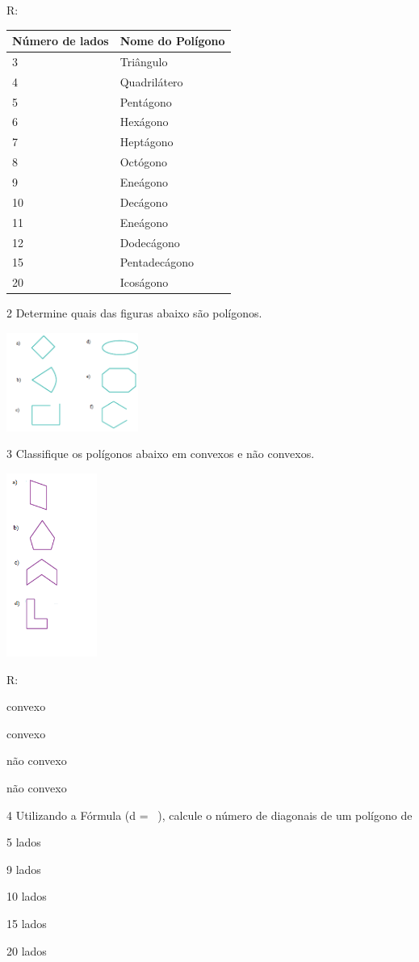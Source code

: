 {R: \begin{longtable}[]{@{}ll@{}}
\toprule
Número de lados & Nome do Polígono\tabularnewline
\midrule
\endhead
3 & Triângulo\tabularnewline
4 & Quadrilátero\tabularnewline
5 & Pentágono\tabularnewline
6 & Hexágono\tabularnewline
7 & Heptágono\tabularnewline
8 & Octógono\tabularnewline
9 & Eneágono\tabularnewline
10 & Decágono\tabularnewline
11 & Eneágono\tabularnewline
12 & Dodecágono\tabularnewline
15 & Pentadecágono\tabularnewline
20 & Icoságono\tabularnewline
\bottomrule
\end{longtable}

\num{2} Determine quais das figuras abaixo são polígonos.

\includegraphics[width=1.7in,height=1.26763in]{./imgSAEB_8_MAT/media/image7.png}


\num{3} Classifique os polígonos abaixo em convexos e não convexos.

\includegraphics[width=1.16236in,height=2.36667in]{./imgSAEB_8_MAT/media/image8.png}

R:
\item convexo
\item convexo
\item não convexo
\item não convexo

\num{4} Utilizando a Fórmula (d = \ ), calcule o número
de diagonais de um polígono de
\item 5 lados
\item 9 lados
\item 10 lados
\item 15 lados
\item 20 lados

}
